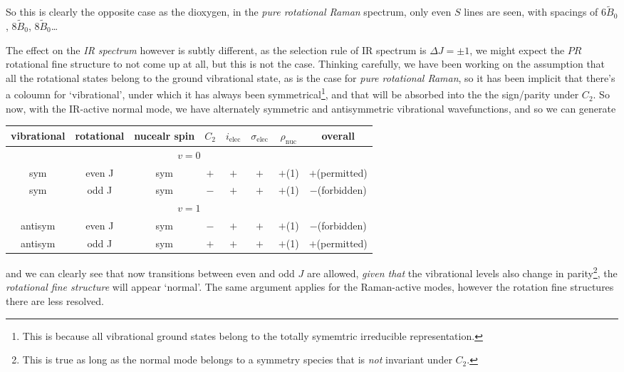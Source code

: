 So this is clearly the opposite case as the dioxygen, in the \emph{pure rotational Raman} spectrum, only even $S$ lines are seen, with spacings of 6$\widetilde{B}_0$, 8$\widetilde{B}_0$, 8$\widetilde{B}_0$\dots\par
The effect on the \emph{IR spectrum} however is subtly different, as the selection rule of IR spectrum is $\Delta J=\pm1$, we might expect the $PR$ rotational fine structure to not come up at all, but this is not the case. Thinking carefully, we have been working on the assumption that all the rotational states belong to the ground vibrational state, as is the case for \emph{pure rotational Raman}, so it has been implicit that there's a coloumn for `vibrational', under which it has always been symmetrical\footnote{This is because all vibrational ground states belong to the totally symemtric irreducible representation.}, and that will be absorbed into the the sign/parity under $C_2$. So now, with the IR-active normal mode, we have alternately symmetric and antisymmetric vibrational wavefunctions, and so we can generate 
\begin{center}
\begin{tabular}{ccc|cccc|c}
\hline
vibrational & rotational & nucealr spin & $C_2$ & $i_{\text{elec}}$ & $\sigma_{\text{elec}}$ & $\rho_{\text{nuc}}$ & overall\\
\hline
\multicolumn{8}{c}{$v=0$}\\
\hline
sym & even J & sym & $+$ & $+$ & $+$ & $+$(1) & $+$(permitted)\\
sym & odd J & sym & $-$ & $+$ & $+$ & $+$(1) & $-$(forbidden)\\
\hline
\multicolumn{8}{c}{$v=1$}\\
\hline
antisym & even J & sym & $-$ & $+$ & $+$ & $+$(1) & $-$(forbidden)\\
antisym & odd J & sym & $+$ & $+$ & $+$ & $+$(1) & $+$(permitted)\\
\hline
\end{tabular}
\end{center}
and we can clearly see that now transitions between even and odd $J$ are allowed, \emph{given that} the vibrational levels also change in parity\footnote{This is true as long as the normal mode belongs to a symmetry species that is \emph{not} invariant under $C_2$.}, the \emph{rotational fine structure} will appear `normal'. The same argument applies for the Raman-active modes, however the rotation fine structures there are less resolved.

